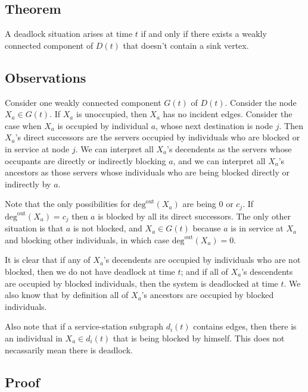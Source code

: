 \documentclass{article}
\begin{document}
\subsection*{Theorem}

A deadlock situation arises at time $t$ if and only if there exists a weakly connected component of $D(t)$ that doesn't contain a sink vertex.\newline

\subsection*{Observations}

Consider one weakly connected component $G(t)$ of $D(t)$.
Consider the node $X_a \in G(t)$. If $X_a$ is unoccupied, then $X_a$ has no incident edges.
Consider the case when $X_a$ is occupied by individual $a$, whose next destination is node $j$.
Then $X_a$'s direct successors are the servers occupied by individuals who are blocked or in service at node $j$.
We can interpret all $X_a$'s decendents as the servers whose occupants are directly or indirectly blocking $a$, and we can interpret all $X_a$'s ancestors as those servers whose individuals who are being blocked directly or indirectly by $a$.\newline

Note that the only possibilities for $\text{deg}^{\text{out}}(X_a)$ are being 0 or $c_j$.
If $\text{deg}^{\text{out}}(X_a) = c_j$ then $a$ is blocked by all its direct successors.
The only other situation is that $a$ is not blocked, and $X_a \in G(t)$ because $a$ is in service at $X_a$ and blocking other individuals, in which case $\text{deg}^{\text{out}}(X_a) = 0$.\newline

It is clear that if any of $X_a$'s decendents are occupied by individuals who are not blocked, then we do not have deadlock at time $t$; and if all of $X_a$'s descendents are occupied by blocked individuals, then the system is deadlocked at time $t$.
We also know that by definition all of $X_a$'s ancestors are occupied by blocked individuals.\newline

Also note that if a service-station subgraph $d_i(t)$ contains edges, then there is an individual in $X_a \in d_i(t)$ that is being blocked by himself.
This does not necassarily mean there is deadlock.\newline

\subsection*{Proof}
\end{document}
